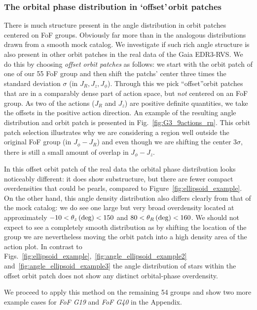 \documentclass[twocolumn]{aastex631}
\begin{document}
\subsubsection{The orbital phase distribution in \textquoteleft offset\textquoteright\,orbit patches}
\label{sec:random_ellipsoid}

There is much structure present in the angle distribution in orbit patches centered on FoF groups. Obviously far more than in the analogous distributions drawn from a smooth mock catalog. We investigate if such rich angle structure is also present in other orbit patches in the real data of the Gaia EDR3-RVS. We do this by choosing \textit{offset orbit patches} as follows: we start with the orbit patch of one of our 55 FoF group and then shift the patchs' center three times the standard deviation $\sigma$ (in $J_{R}, J_{z}, J_{\phi}$). Through this we pick \textquotedblleft offset\textquotedblright orbit patches that are in a comparably dense part of action space, but \emph{not} centered on an FoF group. As two of the actions ($J_R$ and $J_z$) are positive definite quantities, we take the offsets in the positive action direction. An example of the resulting angle distribution and orbit patch is presented in Fig.~\ref{fig:G3_9actions_rn}.
This orbit patch selection illustrates why we are considering a region well outside the original FoF group (in $J_{\phi}-J_{R}$) and even though we are shifting the center 3$\sigma$, there is still a small amount of overlap in $J_{\phi}-J_{z}$. 

In this offset orbit patch of the real data the orbital phase distribution looks noticeably different: it does show substructure, but there are fewer compact overdensities that could be pearls, compared to Figure~\ref{fig:ellipsoid_example}. 
On the other hand, this angle density distribution also differs clearly from that of the mock catalog: we do see one large but very broad overdensity located at approximately $-10 <\theta_{z}\, \rm{(deg)} < 150$ and $80<\theta_{R}\, \rm{(deg)} < 160$. We should not expect to see a completely smooth distribution as by shifting the location of the group we are nevertheless moving the orbit patch into a high density area of the action plot. In contrast to Figs.~\ref{fig:ellipsoid_example},~\ref{fig:angle_ellipsoid_example2} and~\ref{fig:angle_ellipsoid_example3} the angle distribution of stars within the offset orbit patch does not show any distinct orbital-phase overdensity. 

We proceed to apply this method on the remaining 54 groups and show two more example cases for \textit{FoF G19} and \textit{FoF G40} in the Appendix.
\end{document}
